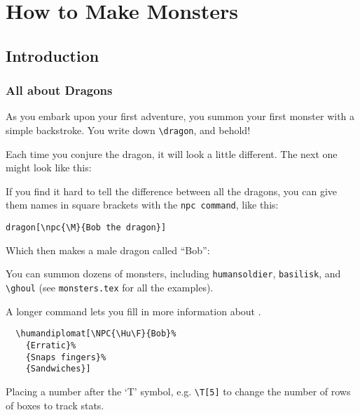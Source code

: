 \documentclass[a4paper,openany]{book}
\date{\today}
\begin{document}
\chapter{How to Make Monsters}

\section{Introduction}

\begin{multicols}{2}

\subsection{All about Dragons}

\begin{boxtext}

As you embark upon your first adventure, you summon your first monster with a simple backstroke.
You write down \verb"\dragon", and behold!

\end{boxtext}


Each time you conjure the dragon, it will look a little different.
The next one might look like this:

\dragon

If you find it hard to tell the difference between all the dragons, you can give them names in square brackets with the \verb"npc command", like this:

\verb"dragon[\npc{\M}{Bob the dragon}]"

Which then makes a male dragon called ``Bob'':


You can summon dozens of monsters, including \verb"humansoldier", \verb"basilisk", and \verb"\ghoul"
(see \verb"monsters.tex" for all the examples).

A longer command lets you fill in more information about .

\begin{verbatim}
  \humandiplomat[\NPC{\Hu\F}{Bob}%
    {Erratic}%
    {Snaps fingers}%
    {Sandwiches}]
\end{verbatim}


Placing a number after the `T' symbol, e.g. \verb"\T[5]" to change the number of rows of boxes to track stats.


\end{multicols}
\end{document}

